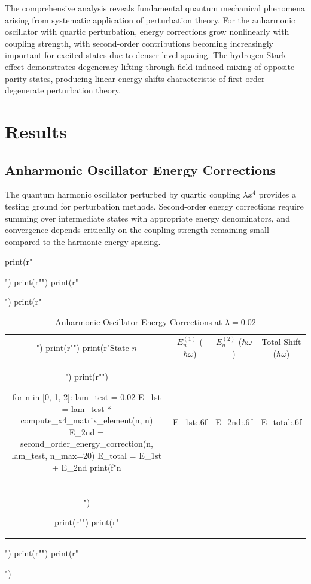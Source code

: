 \documentclass[a4paper, 11pt]{article}
\begin{document}
The comprehensive analysis reveals fundamental quantum mechanical phenomena arising
from systematic application of perturbation theory. For the anharmonic oscillator
with quartic perturbation, energy corrections grow nonlinearly with coupling strength,
with second-order contributions becoming increasingly important for excited states
due to denser level spacing. The hydrogen Stark effect demonstrates degeneracy
lifting through field-induced mixing of opposite-parity states, producing linear
energy shifts characteristic of first-order degenerate perturbation theory.

\section{Results}

\subsection{Anharmonic Oscillator Energy Corrections}

The quantum harmonic oscillator perturbed by quartic coupling $\lambda x^4$
provides a testing ground for perturbation methods. Second-order energy
corrections require summing over intermediate states with appropriate
energy denominators, and convergence depends critically on the coupling
strength remaining small compared to the harmonic energy spacing.

\begin{pycode}
print(r"\begin{table}[htbp]")
print(r"\centering")
print(r"\caption{Anharmonic Oscillator Energy Corrections at $\lambda = 0.02$}")
print(r"\begin{tabular}{cccc}")
print(r"\toprule")
print(r"State $n$ & $E_n^{(1)}$ ($\hbar\omega$) & $E_n^{(2)}$ ($\hbar\omega$) & Total Shift ($\hbar\omega$) \\")
print(r"\midrule")

for n in [0, 1, 2]:
    lam_test = 0.02
    E_1st = lam_test * compute_x4_matrix_element(n, n)
    E_2nd = second_order_energy_correction(n, lam_test, n_max=20)
    E_total = E_1st + E_2nd
    print(f"{n} & {E_1st:.6f} & {E_2nd:.6f} & {E_total:.6f} \\\\")

print(r"\bottomrule")
print(r"\end{tabular}")
print(r"\label{tab:anharmonic}")
print(r"\end{table}")
\end{pycode}
\end{document}
